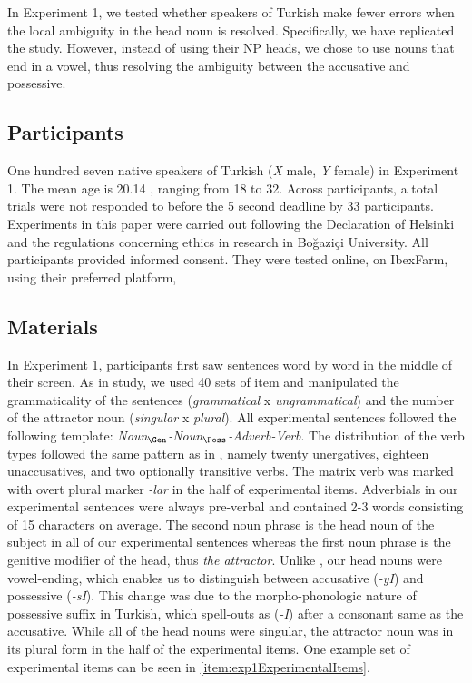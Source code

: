 \documentclass[doc,a4paper,man,natbib,floatsintext,noextraspace]{apa6}\usepackage[]{graphicx}\usepackage[]{color}
\begin{document}
In Experiment 1, we tested whether speakers of Turkish make fewer errors when the local ambiguity in the head noun is resolved. Specifically, we have replicated the \citet{LagoEtAl:2018} study. However, instead of using their NP heads, we chose to use nouns that end in a vowel, thus resolving the ambiguity between the accusative and possessive. 

\subsection{Participants} \label{sec:exp1:participants}

One hundred seven native speakers of Turkish (\textit{X} male, \textit{Y} female) in Experiment 1. The mean age is 20.14 , ranging from 18 to 32. Across participants, a total  trials were not responded to before the 5 second deadline by 33 participants. Experiments in this paper were carried out following the Declaration of Helsinki and the regulations concerning ethics in research in Bo\u{g}azi\c{c}i University. All participants provided informed consent. They were tested online, on IbexFarm, using their preferred platform, 

\subsection{Materials} \label{sec:exp1:materials}

In Experiment 1, participants first saw sentences word by word in the middle of their screen. As in \citet{LagoEtAl:2018} study, we used 40 sets of item and manipulated the grammaticality of the sentences (\textit{grammatical} x \textit{ungrammatical}) and the number of the attractor noun (\textit{singular} x \textit{plural}). All experimental sentences followed the following template: \textit{Noun$_{\Gen}$-Noun$_{\Poss}$-Adverb-Verb}. The distribution of the verb types followed the same pattern as in \citet{LagoEtAl:2018}, namely twenty unergatives, eighteen unaccusatives, and two optionally transitive verbs. The matrix verb was marked with overt plural marker \textit{-lar} in the half of experimental items. Adverbials in our experimental sentences were always pre-verbal and contained 2-3 words consisting of 15 characters on average. The second noun phrase is the head noun of the subject in all of our experimental sentences whereas the first noun phrase is the genitive modifier of the head, thus \textit{the attractor}. Unlike \citet{LagoEtAl:2018}, our head nouns were vowel-ending, which enables us to distinguish between accusative (\textit{-yI}) and possessive (\textit{-sI}). This change was due to the morpho-phonologic nature of possessive suffix in Turkish, which spell-outs as (\textit{-I}) after a consonant same as the accusative. While all of the head nouns were singular, the attractor noun was in its plural form in the half of the experimental items. One example set of experimental items can be seen in \ref{item:exp1ExperimentalItems}.
\end{document}
